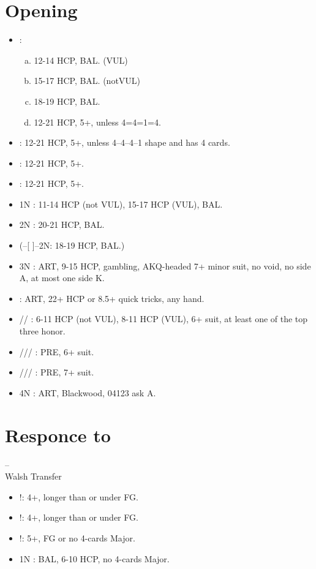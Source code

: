 \documentclass[12pt,twoside,a5paper]{report}%
\begin{document}
\chapter*{Opening}
	\begin{itemize}
	\renewcommand{\labelitemi}{}
		\item {}: 
		\begin{enumerate}[(a)]
			\item 12-14 HCP, BAL. (VUL)
			\item 15-17 HCP, BAL. (notVUL)
			\item 18-19 HCP, BAL.
			\item 12-21 HCP, 5+\cl{}, unless 4=4=1=4.
		\end{enumerate}
		\item {} : 12-21 HCP, 5+\di{}, unless 4--4--4--1 shape and \di{} has 4 cards.
		\item {} : 12-21 HCP, 5+\he{}.
		\item {} : 12-21 HCP, 5+\sp{}.
		\item 1N : 11-14 HCP (not VUL), 15-17 HCP (VUL), BAL.
		\item 2N : 20-21 HCP, BAL.
		\item (--[ ]--2N: 18-19 HCP, BAL.)
		\item 3N : ART, 9-15 HCP, gambling, AKQ-headed 7+ minor suit, no void, no side A, at most one side K.
		\item {} : ART, 22+ HCP or 8.5+ quick tricks, any hand.
		\item {}/\he{}/\sp{} : 6-11 HCP (not VUL), 8-11 HCP (VUL), 6+ suit, at least one of the top three honor.
		\item {}/\di{}/\he{}/\sp{} : PRE, 6+ suit.
		\item {}/\di{}/\he{}/\sp{} : PRE, 7+ suit.
		\item 4N : ART, Blackwood, 04123 ask A.
	\end{itemize}
\chapter*{Responce to }
	-- \\

	Walsh Transfer
	\begin{itemize}
	\renewcommand{\labelitemi}{}
	\item {}!: 4+\he{}, \he{} longer than \di{} or under FG.
	\item {}!: 4+\sp{}, \sp{} longer than \di{} or under FG.
	\item {}!: 5+\di{}, FG or no 4-cards Major.
	\item 1N : BAL, 6-10 HCP, no 4-cards Major.
	\end{itemize}
	
\end{document}
